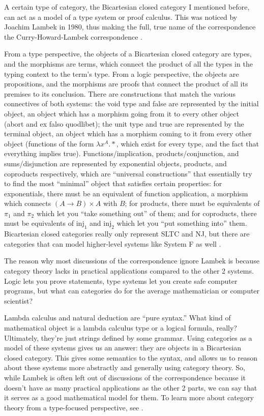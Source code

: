 \documentclass[12pt]{article}
\begin{document}
A certain type of category, the Bicartesian closed category I mentioned before, can act as a model of a type system or proof calculus. This was noticed by Joachim Lambek in 1980, thus making the full, true name of the correspondence the Curry-Howard-Lambek correspondence \cite{farooqui}.

From a type perspective, the objects of a Bicartesian closed category are types, and the morphisms are terms, which connect the product of all the types in the typing context to the term's type. From a logic perspective, the objects are propositions, and the morphisms are proofs that connect the product of all its premises to its conclusion. There are constructions that match the various connectives of both systems: the void type and false are represented by the initial object, an object which has a morphism going from it to every other object (abort and ex falso quodlibet); the unit type and true are represented by the terminal object, an object which has a morphism coming to it from every other object (functions of the form $\lambda x^A.*$, which exist for every type, and the fact that everything implies true). Functions/implication, products/conjunction, and sums/disjunction are represented by exponential objects, products, and coproducts respectively, which are ``universal constructions'' that essentially try to find the most ``minimal'' object that satisfies certain properties: for exponentials, there must be an equivalent of function application, a morphism which connects $(A \to B) \times A$ with $B$; for products, there must be equivalents of $\pi_1$ and $\pi_2$ which let you ``take something out'' of them; and for coproducts, there must be equivalents of $\text{inj}_1$ and $\text{inj}_2$ which let you ``put something into'' them. Bicartesian closed categories really only represent SLTC and NJ, but there are categories that can model higher-level systems like System F as well \cite{asperti}.

The reason why most discussions of the correspondence ignore Lambek is because category theory lacks in practical applications compared to the other 2 systems. Logic lets you prove statements, type systems let you create safe computer programs, but what can categories do for the average mathematician or computer scientist?

Lambda calculus and natural deduction are ``pure syntax.'' What kind of mathematical object is a lambda calculus type or a logical formula, really? Ultimately, they're just strings defined by some grammar. Using categories as a model of these systems gives us an answer: they are objects in a Bicartesian closed category. This gives some semantics to the syntax, and allows us to reason about these systems more abstractly and generally using category theory. So, while Lambek is often left out of discussions of the correspondence because it doesn't have as many practical applications as the other 2 parts, we can say that it serves as a good mathematical model for them. To learn more about category theory from a type-focused perspective, see \cite{crole}.
\end{document}
